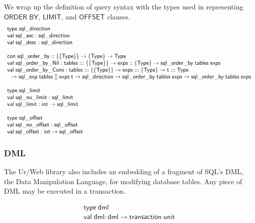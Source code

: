 \documentclass{article}
\newcommand{\mt}[1]{\mathsf{#1}}
\begin{document}
We wrap up the definition of query syntax with the types used in representing $\mt{ORDER} \; \mt{BY}$, $\mt{LIMIT}$, and $\mt{OFFSET}$ clauses.
$$\begin{array}{l}
  \mt{type} \; \mt{sql\_direction} \\
  \mt{val} \; \mt{sql\_asc} : \mt{sql\_direction} \\
  \mt{val} \; \mt{sql\_desc} : \mt{sql\_direction} \\
  \\
  \mt{con} \; \mt{sql\_order\_by} :: \{\{\mt{Type}\}\} \to \{\mt{Type}\} \to \mt{Type} \\
  \mt{val} \; \mt{sql\_order\_by\_Nil} : \mt{tables} ::: \{\{\mt{Type}\}\} \to \mt{exps} :: \{\mt{Type}\} \to \mt{sql\_order\_by} \; \mt{tables} \; \mt{exps} \\
  \mt{val} \; \mt{sql\_order\_by\_Cons} : \mt{tables} ::: \{\{\mt{Type}\}\} \to \mt{exps} ::: \{\mt{Type}\} \to \mt{t} ::: \mt{Type} \\
  \hspace{.1in} \to \mt{sql\_exp} \; \mt{tables} \; [] \; \mt{exps} \; \mt{t} \to \mt{sql\_direction} \to \mt{sql\_order\_by} \; \mt{tables} \; \mt{exps} \to \mt{sql\_order\_by} \; \mt{tables} \; \mt{exps} \\
  \\
  \mt{type} \; \mt{sql\_limit} \\
  \mt{val} \; \mt{sql\_no\_limit} : \mt{sql\_limit} \\
  \mt{val} \; \mt{sql\_limit} : \mt{int} \to \mt{sql\_limit} \\
  \\
  \mt{type} \; \mt{sql\_offset} \\
  \mt{val} \; \mt{sql\_no\_offset} : \mt{sql\_offset} \\
  \mt{val} \; \mt{sql\_offset} : \mt{int} \to \mt{sql\_offset}
\end{array}$$


\subsubsection{DML}

The Ur/Web library also includes an embedding of a fragment of SQL's DML, the Data Manipulation Language, for modifying database tables.  Any piece of DML may be executed in a transaction.

$$\begin{array}{l}
  \mt{type} \; \mt{dml} \\
  \mt{val} \; \mt{dml} : \mt{dml} \to \mt{transaction} \; \mt{unit}
\end{array}$$
\end{document}
